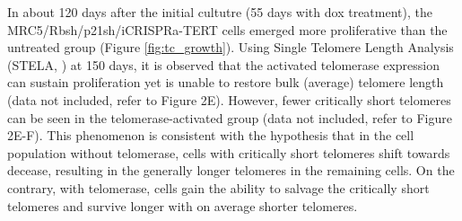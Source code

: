 \documentclass[phd,tocprelim]{cornell}
\begin{document}

In about 120 days after the initial cultutre (55 days with dox treatment), the MRC5/Rbsh/p21sh/iCRISPRa-TERT cells emerged more proliferative than the untreated group (Figure \ref{fig:tc_growth}). Using Single Telomere Length Analysis (STELA, \cite{Baird2003-cj}) at 150 days, it is observed that the activated telomerase expression can sustain proliferation yet is unable to restore bulk (average) telomere length (data not included, refer to \cite{Dewhurst2021-jk} Figure 2E). However, fewer critically short telomeres can be seen in the telomerase-activated group (data not included, refer to \cite{Dewhurst2021-jk} Figure 2E-F). This phenomenon is consistent with the hypothesis that in the cell population without telomerase, cells with critically short telomeres shift towards decease, resulting in the generally longer telomeres in the remaining cells. On the contrary, with telomerase, cells gain the ability to salvage the critically short telomeres and survive longer with on average shorter telomeres.
\end{document}
